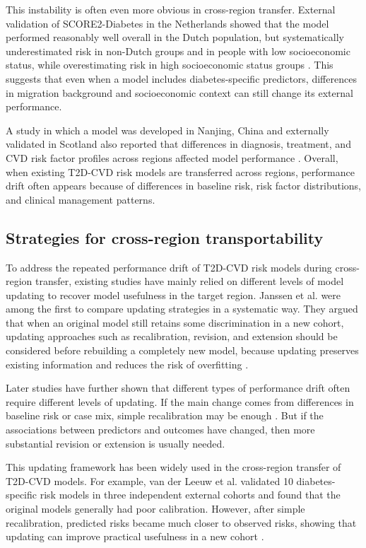 \documentclass[conference]{IEEEtran}
\begin{document}
This instability is often even more obvious in cross-region transfer. External validation of SCORE2-Diabetes in the Netherlands showed that the model performed reasonably well overall in the Dutch population, but systematically underestimated risk in non-Dutch groups and in people with low socioeconomic status, while overestimating risk in high socioeconomic status groups \cite{alfaraj2025external}. This suggests that even when a model includes diabetes-specific predictors, differences in migration background and socioeconomic context can still change its external performance.

A study in which a model was developed in Nanjing, China and externally validated in Scotland also reported that differences in diagnosis, treatment, and CVD risk factor profiles across regions affected model performance \cite{wan2022prediction}. Overall, when existing T2D-CVD risk models are transferred across regions, performance drift often appears because of differences in baseline risk, risk factor distributions, and clinical management patterns.

\subsection{Strategies for cross-region transportability}

To address the repeated performance drift of T2D-CVD risk models during cross-region transfer, existing studies have mainly relied on different levels of model updating to recover model usefulness in the target region. Janssen et al. were among the first to compare updating strategies in a systematic way. They argued that when an original model still retains some discrimination in a new cohort, updating approaches such as recalibration, revision, and extension should be considered before rebuilding a completely new model, because updating preserves existing information and reduces the risk of overfitting \cite{janssen2008updating}.

Later studies have further shown that different types of performance drift often require different levels of updating. If the main change comes from differences in baseline risk or case mix, simple recalibration may be enough \cite{binuya2022methodological}. But if the associations between predictors and outcomes have changed, then more substantial revision or extension is usually needed.

This updating framework has been widely used in the cross-region transfer of T2D-CVD models. For example, van der Leeuw et al. validated 10 diabetes-specific risk models in three independent external cohorts and found that the original models generally had poor calibration. However, after simple recalibration, predicted risks became much closer to observed risks, showing that updating can improve practical usefulness in a new cohort \cite{van2015validation}.
\end{document}
